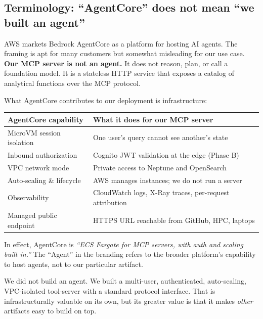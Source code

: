 \documentclass[11pt,letterpaper]{article}
\begin{document}
\subsection{Terminology: ``AgentCore'' does not mean ``we built an agent''}

AWS markets Bedrock AgentCore as a platform for hosting AI agents. The
framing is apt for many customers but somewhat misleading for our use
case. \textbf{Our MCP server is not an agent.} It does not reason, plan,
or call a foundation model. It is a stateless HTTP service that exposes
a catalog of analytical functions over the MCP protocol.

What AgentCore contributes to our deployment is infrastructure:

\begin{center}
\begin{tabularx}{\textwidth}{@{}l X@{}}
\toprule
\textbf{AgentCore capability} & \textbf{What it does for our MCP server} \\
\midrule
MicroVM session isolation & One user's query cannot see another's state \\
Inbound authorization & Cognito JWT validation at the edge (Phase B) \\
VPC network mode & Private access to Neptune and OpenSearch \\
Auto-scaling \& lifecycle & AWS manages instances; we do not run a server \\
Observability & CloudWatch logs, X-Ray traces, per-request attribution \\
Managed public endpoint & HTTPS URL reachable from GitHub, HPC, laptops \\
\bottomrule
\end{tabularx}
\end{center}

In effect, AgentCore is \emph{``ECS Fargate for MCP servers, with auth and
scaling built in.''} The ``Agent'' in the branding refers to the broader
platform's capability to host agents, not to our particular artifact.

\begin{keyidea}
We did not build an agent. We built a multi-user, authenticated,
auto-scaling, VPC-isolated tool-server with a standard protocol interface.
That is infrastructurally valuable on its own, but its greater value
is that it makes \emph{other} artifacts easy to build on top.
\end{keyidea}

\end{document}
